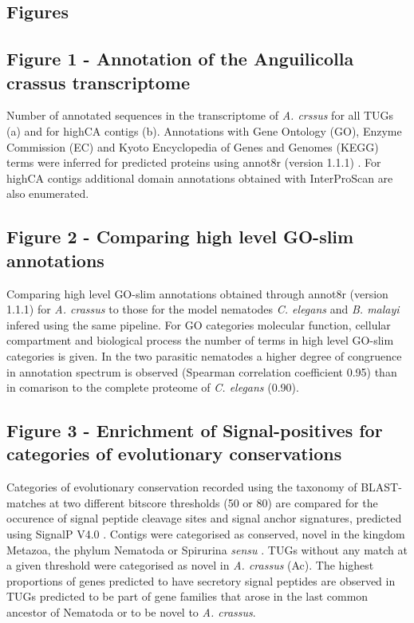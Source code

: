 \documentclass[10pt]{bmc_article}
\newenvironment{bmcformat}{\begin{raggedright}\baselineskip20pt\sloppy\setboolean{publ}{false}}{\end{raggedright}\baselineskip20pt\sloppy}
\begin{document}
\begin{bmcformat}

\section*{Figures}

\subsection*{Figure 1 - Annotation of the Anguilicolla crassus transcriptome}
 

Number of annotated sequences in the transcriptome of
\textit{A. crssus} for all TUGs (a) and for highCA contigs
(b). Annotations with Gene Ontology (GO), Enzyme Commission (EC) and
Kyoto Encyclopedia of Genes and Genomes (KEGG) terms were inferred for
predicted proteins using annot8r (version 1.1.1)
\cite{schmid_annot8r:_2008}. For highCA contigs additional domain
annotations obtained with InterProScan \cite{pmid11590104} are also
enumerated.

\subsection*{Figure 2 - Comparing high level GO-slim annotations}

Comparing high level GO-slim annotations obtained through annot8r
(version 1.1.1) \cite{schmid_annot8r:_2008} for \textit{A. crassus} to
those for the model nematodes \textit{C. elegans} and
\textit{B. malayi} infered using the same pipeline. For GO categories
molecular function, cellular compartment and biological process the
number of terms in high level GO-slim categories is given. In the two
parasitic nematodes a higher degree of congruence in annotation
spectrum is observed (Spearman correlation coefficient 0.95) than in
comarison to the complete proteome of \textit{C. elegans} (0.90).

\subsection*{Figure 3 - Enrichment of Signal-positives for categories
  of evolutionary conservations}

Categories of evolutionary conservation recorded using the taxonomy of
BLAST-matches at two different bitscore thresholds (50 or 80) are
compared for the occurence of signal peptide cleavage sites and signal
anchor signatures, predicted using SignalP V4.0 \cite{pmid21959131}.
Contigs were categorised as conserved, novel in the kingdom Metazoa,
the phylum Nematoda or Spirurina \textit{sensu}
\cite{blaxter_molecular_1998}. TUGs without any match at a given
threshold were categorised as novel in \textit{A. crassus} (Ac). The
highest proportions of genes predicted to have secretory signal
peptides are observed in TUGs predicted to be part of gene families
that arose in the last common ancestor of Nematoda or to be novel to
\textit{A. crassus}.



\end{bmcformat}
\end{document}
